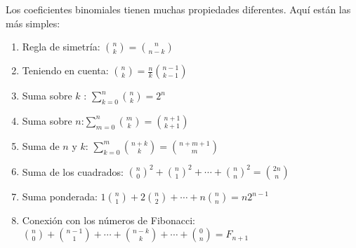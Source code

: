 Los coeficientes binomiales tienen muchas propiedades diferentes. Aquí están las más simples:

\begin{enumerate}
	\item Regla de simetría: $\binom n k = \binom n {n-k}$
	\item Teniendo en cuenta: $\binom n k = \frac n k \binom {n-1} {k-1}$
	\item Suma sobre $k$ : $\sum_{k = 0}^n \binom n k = 2 ^ n$
	\item Suma sobre $n$:$\sum_{m = 0}^n \binom m k = \binom {n + 1} {k + 1}$
	\item Suma de $n$ y $k$: $\sum_{k = 0}^m \binom {n + k} k = \binom {n + m + 1} m$
	\item Suma de los cuadrados: ${\binom n 0}^2 + {\binom n 1}^2 + \cdots + {\binom n n}^2 = \binom {2n} n$
	\item Suma ponderada: $1 \binom n 1 + 2 \binom n 2 + \cdots + n \binom n n = n 2^{n-1}$
	\item Conexión con los números de Fibonacci: $\binom n 0 + \binom {n-1} 1 + \cdots + \binom {n-k} k + \cdots + \binom 0 n = F_{n+1}$
\end{enumerate}